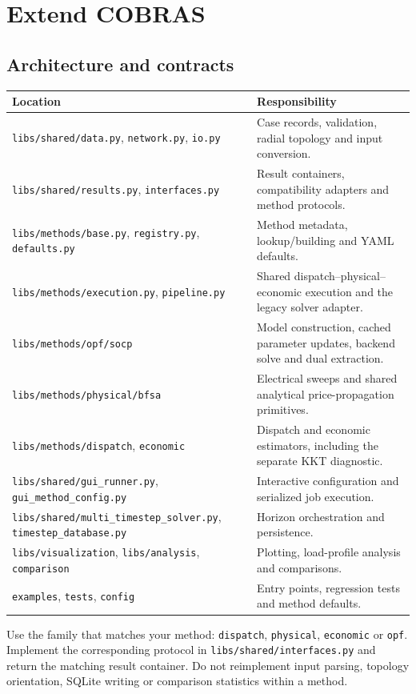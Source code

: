 \documentclass[11pt,a4paper]{article}
\newcommand{\code}[1]{\nolinkurl{#1}}
\begin{document}
\section{Extend COBRAS}
\label{sec:extend}
\subsection{Architecture and contracts}
\begin{longtable}{p{.39\linewidth}p{.53\linewidth}}
\toprule Location & Responsibility \\\midrule\endhead
\code{libs/shared/data.py}, \code{network.py}, \code{io.py} & Case records, validation, radial topology and input conversion.\\
\code{libs/shared/results.py}, \code{interfaces.py} & Result containers, compatibility adapters and method protocols.\\
\code{libs/methods/base.py}, \code{registry.py}, \code{defaults.py} & Method metadata, lookup/building and YAML defaults.\\
\code{libs/methods/execution.py}, \code{pipeline.py} & Shared dispatch--physical--economic execution and the legacy solver adapter.\\
\code{libs/methods/opf/socp} & Model construction, cached parameter updates, backend solve and dual extraction.\\
\code{libs/methods/physical/bfsa} & Electrical sweeps and shared analytical price-propagation primitives.\\
\code{libs/methods/dispatch}, \code{economic} & Dispatch and economic estimators, including the separate KKT diagnostic.\\
\code{libs/shared/gui_runner.py}, \code{gui_method_config.py} & Interactive configuration and serialized job execution.\\
\code{libs/shared/multi_timestep_solver.py}, \code{timestep_database.py} & Horizon orchestration and persistence.\\
\code{libs/visualization}, \code{libs/analysis}, \code{comparison} & Plotting, load-profile analysis and comparisons.\\
\code{examples}, \code{tests}, \code{config} & Entry points, regression tests and method defaults.\\
\bottomrule
\end{longtable}
Use the family that matches your method: \code{dispatch}, \code{physical},
\code{economic} or \code{opf}. Implement the corresponding protocol in
\code{libs/shared/interfaces.py} and return the matching result container.
Do not reimplement input parsing, topology orientation, SQLite writing or
comparison statistics within a method.
\end{document}
